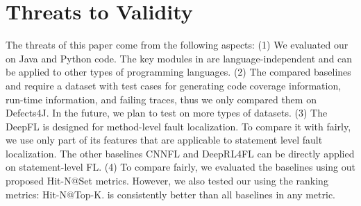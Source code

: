 \section{Threats to Validity}
The threats of this paper come from the following aspects: (1) We
evaluated our {\tool} on Java and Python code. The key modules in
{\tool} are language-independent and can be applied to other types of
programming languages.  (2) The compared baselines and {\tool} require
a dataset with test cases for generating code coverage information,
run-time information, and failing traces, thus we only compared them
on Defects4J. In the future, we plan to test {\tool} on more types of
datasets.  (3) The DeepFL is designed for method-level fault
localization. To compare it with {\tool} fairly, we use only part of
its features that are applicable to statement level fault
localization.  The other baselines CNNFL and DeepRL4FL can be
directly applied on statement-level FL. (4) To compare fairly, we evaluated the baselines using out proposed Hit-N@Set metrics. However, we also tested our {\tool} using the ranking metrics: Hit-N@Top-K. {\tool} is consistently better than all baselines in any metric.


